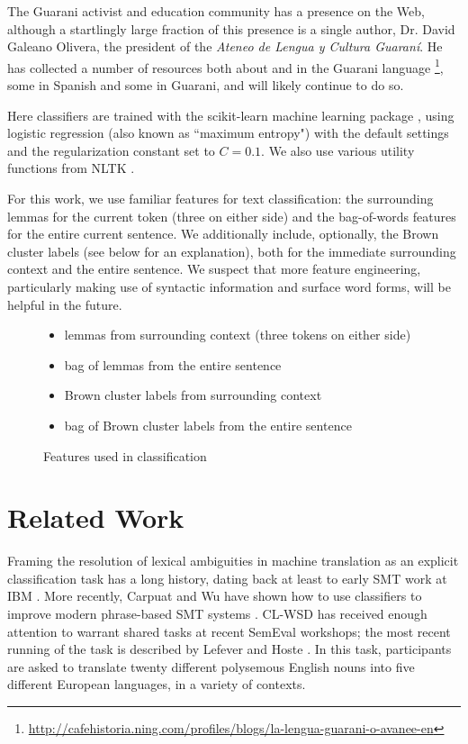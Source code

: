 The Guarani activist and education community has a presence on the Web,
although a startlingly large fraction of this presence is a single author,
Dr. David Galeano Olivera, the president of the \emph{Ateneo de Lengua y
Cultura Guaraní}. He has collected a number of resources both about and in the
Guarani language
\footnote{\url{http://cafehistoria.ning.com/profiles/blogs/la-lengua-guarani-o-avanee-en}},
some in Spanish and some in Guarani, and will likely continue to do so.





Here classifiers are trained with the scikit-learn machine learning package
\cite{scikit-learn}, using logistic regression (also known as ``maximum
entropy") with the default settings and the regularization constant set to
$C=0.1$. We also use various utility functions from NLTK \cite{nltkbook}. 

For this work, we use familiar features for text classification: the
surrounding lemmas for the current token (three on either side) and the
bag-of-words features for the entire current sentence. We additionally include,
optionally, the Brown cluster labels (see below for an explanation),
both for the immediate surrounding context and the entire sentence.
We suspect that more feature engineering, particularly making use of syntactic
information and surface word forms, will be helpful in the future.

\begin{figure}[t!]
  \begin{itemize}
    \item lemmas from surrounding context (three tokens on either side)
    \item bag of lemmas from the entire sentence
    \item Brown cluster labels from surrounding context
    \item bag of Brown cluster labels from the entire sentence
  \end{itemize}
\caption{Features used in classification}
\label{fig:features}
\end{figure}

\section{Related Work}

Framing the resolution of lexical ambiguities in machine translation
as an explicit classification
task has a long history, dating back at least to early SMT work at IBM
\cite{Brown91word-sensedisambiguation}.  More recently, Carpuat and Wu have
shown how to use classifiers to improve modern phrase-based SMT systems
\cite{carpuatpsd}.
CL-WSD has received enough attention to warrant shared tasks at recent SemEval
workshops; the most recent running of the task is described by Lefever and
Hoste \cite{task10}.
In this task, participants are asked to translate twenty different polysemous
English nouns into five different European languages, in a variety of contexts.

